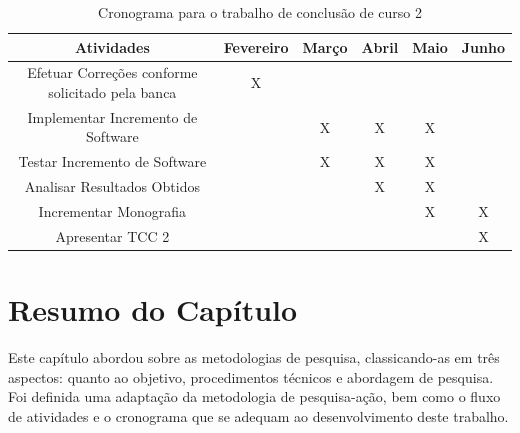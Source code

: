 \begin{table}[h]
  \tiny
  \centering
  \caption{Cronograma para o trabalho de conclusão de curso 2}
  \label{cronograma-tcc-2}
  \begin{tabular}{| c | c | c | c | c | c |}
  \hline
    Atividades & Fevereiro & Março & Abril & Maio & Junho \\ \hline
    Efetuar Correções conforme solicitado pela banca & X &  &  &  &  \\
    Implementar Incremento de Software &  & X & X & X &  \\
    Testar Incremento de Software &  & X & X & X &  \\
    Analisar Resultados Obtidos &  &  & X & X &  \\
    Incrementar Monografia &  &  &  & X & X \\
    Apresentar TCC 2 &  &  &  &  & X \\ \hline
  \end{tabular}
\end{table}
  
  \section{Resumo do Capítulo}
  Este capítulo abordou sobre as metodologias de pesquisa, classicando-as em três aspectos: quanto ao objetivo, procedimentos técnicos e abordagem de pesquisa. Foi definida uma adaptação da metodologia de pesquisa-ação, bem como o fluxo de atividades e o cronograma que se adequam ao desenvolvimento deste trabalho.